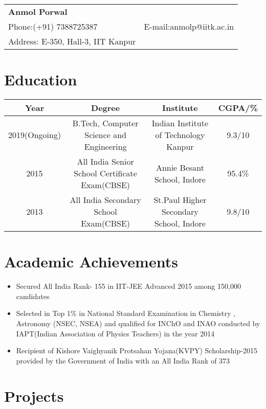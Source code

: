 \documentclass{article}
\begin{document}
\begin{tabular*}{7.54in}{l@{\extracolsep{\fill}}r}
\textbf{\huge Anmol Porwal  }   &  \\
Phone:(+91) 7388725387 &  E-mail:anmolp@iitk.ac.in    \\
Address: E-350, Hall-3, IIT Kanpur & \\
\end{tabular*}

\section{Education}
\begin{center}
\begin{tabular}{ |c|c|c|c| } 
 \hline
 Year & Degree & Institute & CGPA/\% \\ 
 \hline
 2019(Ongoing) & B.Tech, Computer Science and Engineering & Indian Institute of Technology Kanpur & 9.3/10\\ 
 2015 & All India Senior School Certificate Exam(CBSE) & Annie Besant School, Indore & 95.4\%\\ 
 2013 & All India Secondary School Exam(CBSE) & St.Paul Higher Secondary School, Indore & 9.8/10 \\
 
 \hline
\end{tabular}
\end{center}

\section{Academic Achievements}
\begin{itemize}
    \item Secured All India Rank- 155 in IIT-JEE Advanced 2015 among 150,000 candidates
    \item Selected in Top 1\% in National Standard Examination in Chemistry , Astronomy (NSEC, NSEA) and qualified for INChO and INAO conducted by IAPT(Indian Association of Physics Teachers) in the year 2014 
    \item Recipient of Kishore Vaighyanik Protsahan Yojana(KVPY) Scholarship-2015 provided by the Government of India with an All India Rank of 373
\end{itemize}

\section{Projects}
\end{document}
